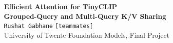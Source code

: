 \documentclass[a0,portrait]{a0poster}
\begin{document}

\begin{minipage}[b]{\linewidth}
\centering
\VeryHuge \color{NavyBlue} \textbf{Efficient Attention for TinyCLIP} \\
\vspace{0.3cm}
\Huge \color{NavyBlue} \textbf{Grouped-Query and Multi-Query K/V Sharing} \\
\vspace{0.9cm}
\large \texttt{Rushat Gabhane} \quad \texttt{[teammates]} \\
\vspace{0.3cm}
\large University of Twente Foundation Models, Final Project
\end{minipage}

\vspace{0.5cm}

\end{document}
